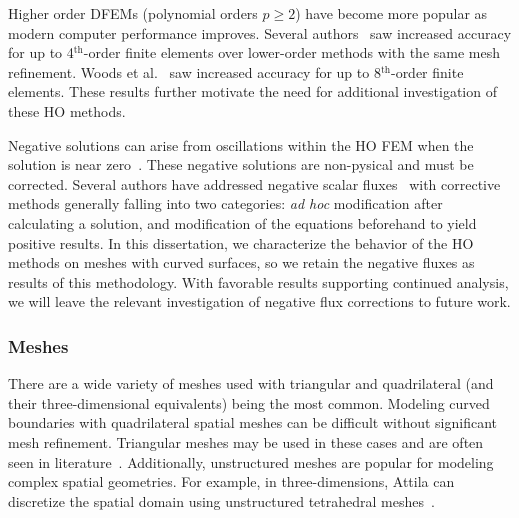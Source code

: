 \documentclass[12pt,letterpaper]{article}
\begin{document}
Higher order DFEMs (polynomial orders $p \geq 2$) have become more popular as modern computer performance improves. Several authors~\cite{WangRagusaDSA, WangHODGTransport, WangDGFEMConvergence, WangDissertation} saw increased accuracy for up to 4$^\text{th}$-order finite elements over lower-order methods with the same mesh refinement. Woods et al.~\cite{WoodsHoDgfemXyCurved} saw increased accuracy for up to 8$^\text{th}$-order finite elements. These results further motivate the need for additional investigation of these HO methods.

Negative solutions can arise from oscillations within the HO FEM when the solution is near zero~\cite{WoodsThesis,WoodsHoDgfemXyCurved}. These negative solutions are non-pysical and must be corrected. Several authors have addressed negative scalar fluxes~\cite{HamiltonNegativeFluxFixups, Adams_Disc_FEM_Thick_Diff, MaginotNonNegative, MaginotLumpingDFEM, BrunnerPreservingPositivity} with corrective methods generally falling into two categories: \emph{ad hoc} modification after calculating a solution, and modification of the equations beforehand to yield positive results. In this dissertation, we characterize the behavior of the HO methods on meshes with curved surfaces, so we retain the negative fluxes as results of this methodology. With favorable results supporting continued analysis, we will leave the relevant investigation of negative flux corrections to future work.



\subsubsection{Meshes}
There are a wide variety of meshes used with triangular and quadrilateral (and their three-dimensional equivalents) being the most common. Modeling curved boundaries with quadrilateral spatial meshes can be difficult without significant mesh refinement. Triangular meshes may be used in these cases and are often seen in literature~\cite{ReedTriangularMesh,WangHODGTransport,WangDGFEMConvergence, MorelLLDrz}. Additionally, unstructured meshes are popular for modeling complex spatial geometries. For example, in three-dimensions, Attila can discretize the spatial domain using unstructured tetrahedral meshes~\cite{WareingAttila}.
\end{document}

